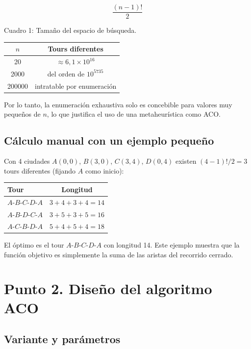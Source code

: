 \documentclass[12pt,a4paper]{article}
\begin{document}
\begin{equation}
\frac{(n-1)!}{2}
\end{equation}

Cuadro 1: Tamaño del espacio de búsqueda.
\begin{center}
\begin{tabular}{cc}
\toprule
$n$ & Tours diferentes \\
\midrule
20 & $\approx 6{,}1 \times 10^{16}$ \\
2000 & del orden de $10^{5735}$ \\
200000 & intratable por enumeración \\
\bottomrule
\end{tabular}
\end{center}

Por lo tanto, la enumeración exhaustiva solo es concebible para valores muy
pequeños de $n$, lo que justifica el uso de una metaheurística como ACO.

\subsection{Cálculo manual con un ejemplo pequeño}

Con 4 ciudades $A(0,0)$, $B(3,0)$, $C(3,4)$, $D(0,4)$ existen $(4-1)!/2 = 3$
tours diferentes (fijando $A$ como inicio):

\begin{center}
\begin{tabular}{lc}
\toprule
Tour & Longitud \\
\midrule
$A$-$B$-$C$-$D$-$A$ & $3 + 4 + 3 + 4 = 14$ \\
$A$-$B$-$D$-$C$-$A$ & $3 + 5 + 3 + 5 = 16$ \\
$A$-$C$-$B$-$D$-$A$ & $5 + 4 + 5 + 4 = 18$ \\
\bottomrule
\end{tabular}
\end{center}

El óptimo es el tour $A$-$B$-$C$-$D$-$A$ con longitud 14. Este ejemplo muestra
que la función objetivo es simplemente la suma de las aristas del recorrido
cerrado.

\section{Punto 2. Diseño del algoritmo ACO}

\subsection{Variante y parámetros}
\end{document}
